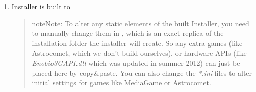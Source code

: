 \documentclass[letterpaper,10pt,english]{sphinxmanual}
\begin{document}
\begin{enumerate}
\item {} 
Installer is built to 
\begin{quote}

\begin{notice}{note}{Note:}
To alter any static elements of the built Installer, you need to manually change them in , which is an exact replica of the installation folder the installer will create. So any extra games (like Astrocomet, which we don't build ourselves), or hardware APIs (like \emph{Enobio3GAPI.dll} which was updated in summer 2012) can just be placed here by copy\&paste. You can also change the \emph{*.ini} files to alter initial settings for games like MediaGame or Astrocomet.
\end{notice}
\end{quote}

\end{enumerate}
\end{document}
